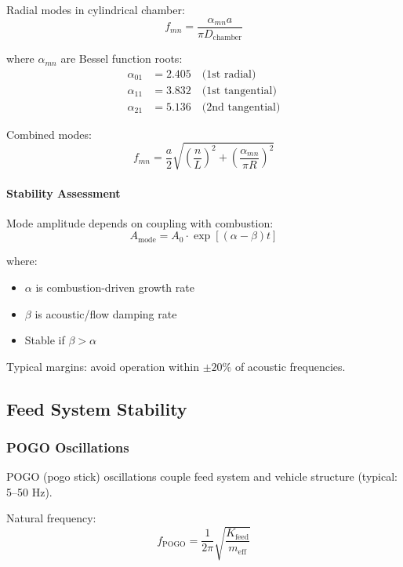 \documentclass[12pt,a4paper]{article}
\begin{document}
Radial modes in cylindrical chamber:
\begin{equation}
f_{mn} = \frac{\alpha_{mn} a}{\pi D_{\text{chamber}}}
\end{equation}

where $\alpha_{mn}$ are Bessel function roots:
\begin{align}
\alpha_{01} &= 2.405 \quad \text{(1st radial)} \\
\alpha_{11} &= 3.832 \quad \text{(1st tangential)} \\
\alpha_{21} &= 5.136 \quad \text{(2nd tangential)}
\end{align}

Combined modes:
\begin{equation}
f_{mn} = \frac{a}{2} \sqrt{\left(\frac{n}{L}\right)^2 + \left(\frac{\alpha_{mn}}{\pi R}\right)^2}
\end{equation}

\paragraph{Stability Assessment}

Mode amplitude depends on coupling with combustion:
\begin{equation}
A_{\text{mode}} = A_0 \cdot \exp\left[(\alpha - \beta) t\right]
\end{equation}

where:
\begin{itemize}
    \item $\alpha$ is combustion-driven growth rate
    \item $\beta$ is acoustic/flow damping rate
    \item Stable if $\beta > \alpha$
\end{itemize}

Typical margins: avoid operation within $\pm 20\%$ of acoustic frequencies.

\subsection{Feed System Stability}

\subsubsection{POGO Oscillations}

POGO (pogo stick) oscillations couple feed system and vehicle structure (typical: 5--50 Hz).

Natural frequency:
\begin{equation}
f_{\text{POGO}} = \frac{1}{2\pi} \sqrt{\frac{K_{\text{feed}}}{m_{\text{eff}}}}
\end{equation}
\end{document}
